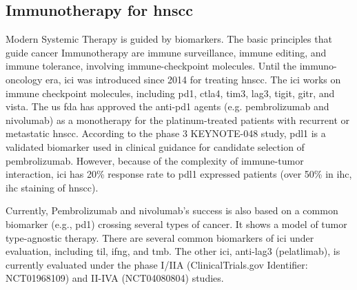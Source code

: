 \documentclass[12pt, a4paper]{article}
\begin{document}










\subsection{Immunotherapy for \acrshort{hnscc}}
Modern Systemic Therapy is guided by biomarkers.
The basic principles that guide cancer Immunotherapy are immune surveillance, immune editing, and immune tolerance\citep{Sharma2017}, involving immune-checkpoint molecules.
Until the immuno-oncology era, \acrfull{ici} was introduced since 2014 for treating \acrshort{hnscc}\citep{Seiwert2014}\citep{Swanson2015}.
The \acrshort{ici} works on immune checkpoint molecules, including \acrfull{pd1}, \acrfull{ctla4}, \acrfull{tim3}, \acrfull{lag3}, \acrfull{tigit}, \acrfull{gitr}, and \acrfull{vista}\citep{Mei2020}.
The \acrshort{us} \acrshort{fda} has approved the anti-\acrshort{pd1} agents (e.g. pembrolizumab and nivolumab) as a monotherapy for the platinum-treated patients with recurrent or metastatic \acrshort{hnscc}\citep{Cramer2019}. 
According to the phase 3 KEYNOTE-048 study, \acrshort{pdl1} is a validated biomarker used in clinical guidance for candidate selection of pembrolizumab\citep{Burtness2019}\citep{Gavrielatou2020}.
However, because of the complexity of immune-tumor interaction, \acrshort{ici} has 20\% response rate to \acrfull{pdl1} expressed patients (over 50\% in \acrlong{ihc}, \acrshort{ihc} staining of \acrshort{hnscc})\citep{Swanson2015}\citep{Gavrielatou2020}.

Currently, Pembrolizumab and nivolumab's success is also based on a common biomarker (e.g., \acrshort{pd1}) crossing several types of cancer.
It shows a model of tumor type-agnostic therapy\citep{Yan2018}.
There are several common biomarkers of \acrfull{ici} under evaluation, including \acrfull{til}, \acrfull{ifng}, and \acrfull{tmb}\citep{Gavrielatou2020}.
The other \acrshort{ici}, anti-\acrshort{lag3} (pelatlimab), is currently evaluated under the phase I/IIA\citep{Cristina2019} (ClinicalTrials.gov Identifier: NCT01968109) and II-IVA\citep{Neal2019} (NCT04080804) studies.
\end{document}
